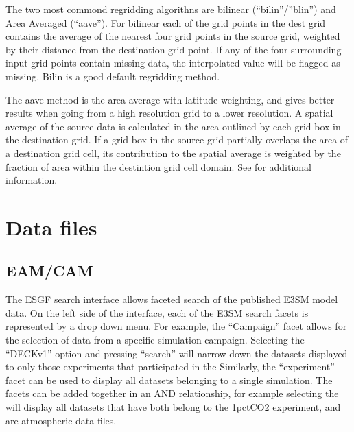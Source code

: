\documentclass[letterpaper,10pt,english]{sphinxmanual}
\begin{document}
The two most commond regridding algorithns are bi\sphinxhyphen{}linear (“bilin”/”blin”) and Area Averaged (“aave”). For bi\sphinxhyphen{}linear each of the grid points in the dest grid contains the
average of the nearest four grid points in the source grid, weighted by their distance from the destination grid point.
If any of the four surrounding input grid points contain missing data, the interpolated value will be flagged as missing. Bilin is a good default regridding method.

The aave method is the area average with latitude weighting, and gives better results when going from a high resolution grid to a lower resolution.
A spatial average of the source data is calculated in the area outlined by each grid box in the destination grid.
If a grid box in the source grid partially overlaps the area of a destination grid cell, its contribution to the spatial average is weighted by the fraction of area within the destintion grid cell domain.
See  for additional information.


\section{Data files}
\label{\detokenize{guide:data-files}}

\subsection{EAM/CAM}
\label{\detokenize{guide:eam-cam}}
 The ESGF search interface allows faceted search of the published E3SM model data.
On the left side of the interface, each of the E3SM search facets is represented by a drop down menu. For example, the “Campaign” facet allows for the selection of data from a specific
simulation campaign. Selecting the “DECK\sphinxhyphen{}v1” option and pressing “search” will narrow down the datasets displayed to only those experiments that participated in the 
Similarly, the “experiment” facet can be used to display all datasets belonging to a single simulation. The facets can be added together in an AND relationship, for example selecting the 
will display all datasets that have both belong to the 1pctCO2 experiment, and are atmospheric data files.
\end{document}
